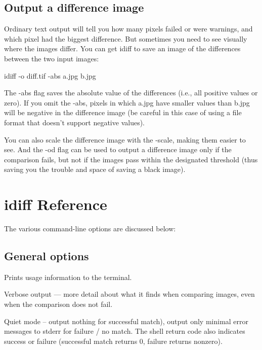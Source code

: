 

\subsection*{Output a difference image}

Ordinary text output will tell you how many pixels failed or were
warnings, and which pixel had the biggest difference.  But sometimes
you need to see visually where the images differ.  You can get
{\cf idiff} to save an image of the differences between the two input
images:

\begin{code}
    idiff -o diff.tif -abs a.jpg b.jpg
\end{code}

The {\cf -abs} flag saves the absolute value of the differences
(i.e., all positive values or zero).  If you omit the {\cf -abs},
pixels in which {\cf a.jpg} have smaller values than {\cf b.jpg}
will be negative in the difference image (be careful in this case
of using a file format that doesn't support negative values).

You can also scale the difference image with the {\cf -scale},
making them easier to see.  And the {\cf -od} flag can be used
to output a difference image only if the comparison fails, but 
not if the images pass within the designated threshold (thus
saving you the trouble and space of saving a black image).


\section{{\cf idiff} Reference}

The various command-line options are discussed below:

\subsection*{General options}

Prints usage information to the terminal.
\apiend

Verbose output --- more detail about what it finds when comparing
images, even when the comparison does not fail.
\apiend

\NEW %
Quiet mode -- output nothing for successful match), output only minimal
error messages to stderr for failure / no match.  The shell return code
also indicates success or failure (successful match returns 0, failure
returns nonzero).
\apiend

